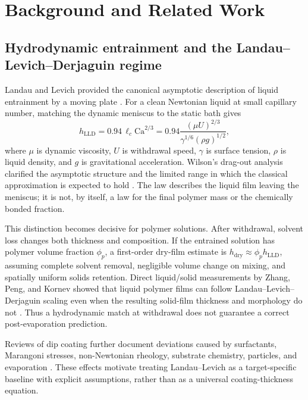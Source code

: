 \documentclass[11pt]{article}
\begin{document}
\section{Background and Related Work}

\subsection{Hydrodynamic entrainment and the Landau--Levich--Derjaguin regime}
Landau and Levich provided the canonical asymptotic description of liquid entrainment by a moving plate \cite{landau1942}. For a clean Newtonian liquid at small capillary number, matching the dynamic meniscus to the static bath gives
\begin{equation}
h_{\mathrm{LLD}} = 0.94\,\ell_c\mathrm{Ca}^{2/3}
=0.94\frac{(\mu U)^{2/3}}{\gamma^{1/6}(\rho g)^{1/2}},
\end{equation}
where $\mu$ is dynamic viscosity, $U$ is withdrawal speed, $\gamma$ is surface tension, $\rho$ is liquid density, and $g$ is gravitational acceleration. Wilson's drag-out analysis clarified the asymptotic structure and the limited range in which the classical approximation is expected to hold \cite{wilson1982}. The law describes the liquid film leaving the meniscus; it is not, by itself, a law for the final polymer mass or the chemically bonded fraction.

This distinction becomes decisive for polymer solutions. After withdrawal, solvent loss changes both thickness and composition. If the entrained solution has polymer volume fraction $\phi_p$, a first-order dry-film estimate is $h_{\mathrm{dry}}\approx\phi_p h_{\mathrm{LLD}}$, assuming complete solvent removal, negligible volume change on mixing, and spatially uniform solids retention. Direct liquid/solid measurements by Zhang, Peng, and Kornev showed that liquid polymer films can follow Landau--Levich--Derjaguin scaling even when the resulting solid-film thickness and morphology do not \cite{zhang2022}. Thus a hydrodynamic match at withdrawal does not guarantee a correct post-evaporation prediction.

Reviews of dip coating further document deviations caused by surfactants, Marangoni stresses, non-Newtonian rheology, substrate chemistry, particles, and evaporation \cite{rio2017}. These effects motivate treating Landau--Levich as a target-specific baseline with explicit assumptions, rather than as a universal coating-thickness equation.
\end{document}
